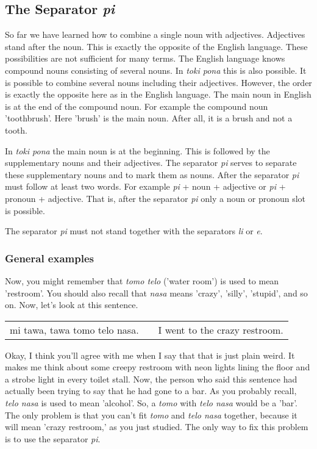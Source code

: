 \subsection*{The Separator \textit{pi}}
%

So far we have learned how to combine a single noun with adjectives. 
Adjectives stand after the noun. 
This is exactly the opposite of the English language.
These possibilities are not sufficient for many terms. 
The English language knows compound nouns consisting of several nouns. 
In \textit{toki pona} this is also possible. 
It is possible to combine several nouns including their adjectives. 
However, the order is exactly the opposite here as in the English language. 
The main noun in English is at the end of the compound noun. 
For example the compound noun 'toothbrush'. Here 'brush' is the main noun. 
After all, it is a brush and not a tooth. 

In \textit{toki pona} the main noun is at the beginning.
This is followed by the supplementary nouns and their adjectives. 
The separator \textit{pi} serves to separate these supplementary nouns and to mark them as nouns. 
After the separator \textit{pi} must follow at least two words. 
For example \textit{pi} + noun + adjective or \textit{pi} + pronoun + adjective. 
That is, after the separator \textit{pi} only a noun or pronoun slot is possible. 

The separator \textit{pi} must not stand together with the separators \textit{li} or \textit{e}.
%
\subsubsection*{General examples} 
%
Now, you might remember that \textit{tomo telo} ('water room') is used to mean 'restroom'. 
You should also recall that \textit{nasa} means 'crazy', 'silly', 'stupid', and so on. 
Now, let's look at this sentence.

\begin{supertabular}{p{5,5cm}|ll}
mi tawa, tawa tomo telo nasa. && I went to the crazy restroom. \\ %
\end{supertabular}  

Okay, I think you'll agree with me when I say that that is just plain weird. 
It makes me think about some creepy restroom with neon lights lining the floor and a strobe light in every toilet stall. 
Now, the person who said this sentence had actually been trying to say that he had gone to a bar. 
As you probably recall, \textit{telo nasa} is used to mean 'alcohol'. 
So, a \textit{tomo} with \textit{telo nasa} would be a 'bar'. 
The only problem is that you can't fit \textit{tomo} and \textit{telo nasa} together, because it will mean 'crazy restroom,' as you just studied. 
The only way to fix this problem is to use the separator \textit{pi}.


